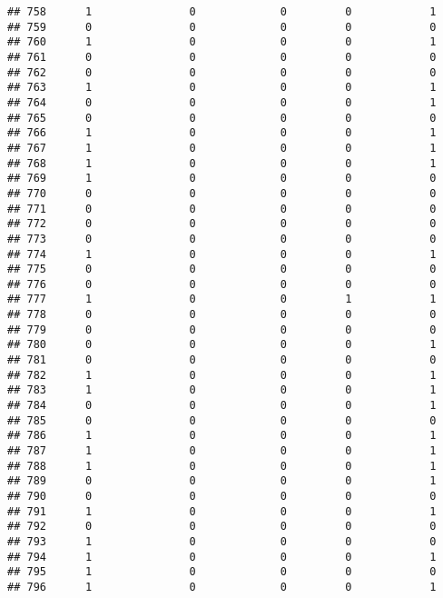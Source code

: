 \documentclass[]{article}
\begin{document}
\begin{verbatim}
## 758      1               0             0         0            1
## 759      0               0             0         0            0
## 760      1               0             0         0            1
## 761      0               0             0         0            0
## 762      0               0             0         0            0
## 763      1               0             0         0            1
## 764      0               0             0         0            1
## 765      0               0             0         0            0
## 766      1               0             0         0            1
## 767      1               0             0         0            1
## 768      1               0             0         0            1
## 769      1               0             0         0            0
## 770      0               0             0         0            0
## 771      0               0             0         0            0
## 772      0               0             0         0            0
## 773      0               0             0         0            0
## 774      1               0             0         0            1
## 775      0               0             0         0            0
## 776      0               0             0         0            0
## 777      1               0             0         1            1
## 778      0               0             0         0            0
## 779      0               0             0         0            0
## 780      0               0             0         0            1
## 781      0               0             0         0            0
## 782      1               0             0         0            1
## 783      1               0             0         0            1
## 784      0               0             0         0            1
## 785      0               0             0         0            0
## 786      1               0             0         0            1
## 787      1               0             0         0            1
## 788      1               0             0         0            1
## 789      0               0             0         0            1
## 790      0               0             0         0            0
## 791      1               0             0         0            1
## 792      0               0             0         0            0
## 793      1               0             0         0            0
## 794      1               0             0         0            1
## 795      1               0             0         0            0
## 796      1               0             0         0            1

\end{verbatim}
\end{document}
